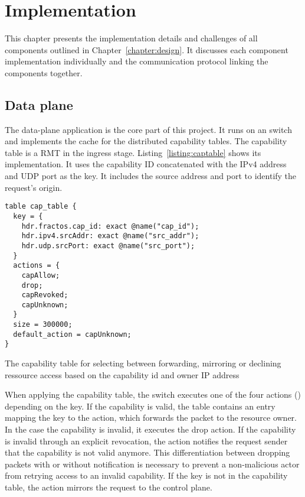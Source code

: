 \chapter{Implementation}\label{chapter:implementation}
\thispagestyle{scrheadings}
This chapter presents the implementation details and challenges of all components outlined in Chapter~\ref{chapter:design}. It discusses each component implementation individually and the communication protocol linking the components together.

\section{Data plane}\label{sec:impl:data-plane}

The data-plane application is the core part of this project. It runs on an \tofino{} switch and implements the cache for the distributed capability tables. The capability table is a \ac{RMT} in the ingress stage. Listing~\ref{listing:captable} shows its implementation. It uses the capability ID concatenated with the \ac{IPv4} address and \ac{UDP} port as the key. It includes the source address and port to identify the request's origin.

\begin{listing}
  \begin{verbatim}
table cap_table {
  key = {
    hdr.fractos.cap_id: exact @name("cap_id");
    hdr.ipv4.srcAddr: exact @name("src_addr");
    hdr.udp.srcPort: exact @name("src_port");
  }
  actions = {
    capAllow;
    drop;
    capRevoked;
    capUnknown;
  }
  size = 300000;
  default_action = capUnknown;
}
  \end{verbatim}
  \caption{\label{listing:captable} The capability table for selecting between forwarding, mirroring or declining ressource access based on the capability id and owner \ac{IP} address}
\end{listing}

When applying the capability table, the switch executes one of the four actions () depending on the key. If the capability is valid, the table contains an entry mapping the key to the  action, which forwards the packet to the resource owner. In the case the capability is invalid, it executes the drop action. If the capability is invalid through an explicit revocation, the  action notifies the request sender that the capability is not valid anymore. This differentiation between dropping packets with or without notification is necessary to prevent a non-malicious actor from retrying access to an invalid capability. If the key is not in the capability table, the  action mirrors the request to the control plane.


